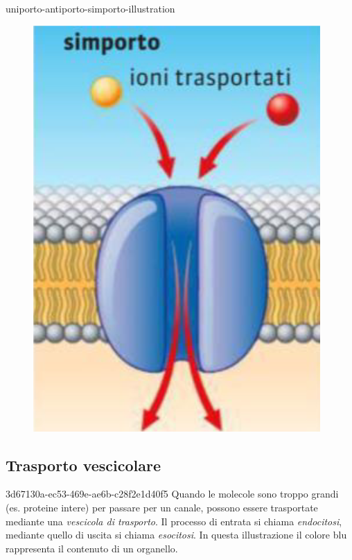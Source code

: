 \documentclass[preview]{standalone}
\begin{document}
\begin{snippet}{uniporto-antiporto-simporto-illustration}
\begin{figure}[h!]
\begin{minipage}{0.3\textwidth}
          \includegraphics[width=\linewidth]{resources/simporto.png}
        \end{minipage}
    \end{figure}
\end{snippet}

\subsection{Trasporto vescicolare}

\begin{snippet}{3d67130a-ec53-469e-ae6b-c28f2e1d40f5}
    Quando le molecole sono troppo grandi (es. proteine intere) per passare per un canale, possono essere trasportate 
    mediante una \textit{vescicola di trasporto}. Il processo di entrata si chiama \textit{endocitosi},
    mediante quello di uscita si chiama \textit{esocitosi}. 
    In questa illustrazione il colore blu rappresenta il contenuto di un organello.
\end{snippet}
\end{document}

